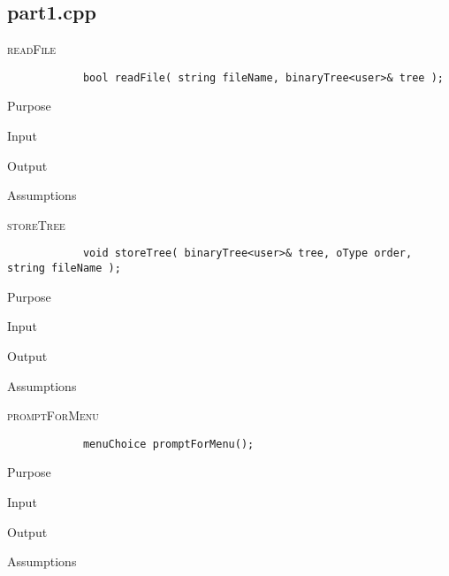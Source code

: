\documentclass[pdftex, 12pt]{article}
\begin{document}
\subsection{part1.cpp}
\begin{description}

	\item{\textsc{readFile}}
		\begin{lstlisting}
			bool readFile( string fileName, binaryTree<user>& tree );
		\end{lstlisting}
		\begin{description}

			\item{Purpose}

			\item{Input}

			\item{Output}

			\item{Assumptions}

		\end{description}
	\item{\textsc{storeTree}}
		\begin{lstlisting}
			void storeTree( binaryTree<user>& tree, oType order, string fileName );
		\end{lstlisting}
		\begin{description}

			\item{Purpose}

			\item{Input}

			\item{Output}

			\item{Assumptions}

		\end{description}
	\item{\textsc{promptForMenu}}
		\begin{lstlisting}
			menuChoice promptForMenu();
		\end{lstlisting}
		\begin{description}

			\item{Purpose}

			\item{Input}

			\item{Output}

			\item{Assumptions}

		\end{description}
\end{description}
\end{document}
